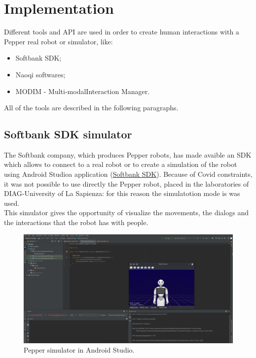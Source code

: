 \documentclass[12pt, letterpaper, twoside]{article}
\begin{document}
\section{Implementation}
Different tools and API are used in order to create human interactions with a Pepper real robot or simulator, like:

\begin{itemize}
	\item Softbank SDK;
	\item Naoqi softwares;
	\item MODIM - Multi-modalInteraction Manager.
\end{itemize}

All of the tools are described in the following paragraphs.\\

\subsection{Softbank SDK simulator}
The Softbank company, which produces Pepper robots, has made avaible an SDK which allows to connect to a real robot or to create a simulation of the robot using Android Studioa application (\href{https://qisdk.softbankrobotics.com/sdk/doc/pepper-sdk/index.html}{Softbank SDK}). Because of Covid constraints, it was not possible to use directly the Pepper robot, placed in the laboratories of DIAG-University of La Sapienza: for this reason the simulatotion mode is was used.\\

This simulator gives the opportunity of visualize the movements, the dialogs and the interactions that the robot has with people.

\begin{figure}[htbp]
	\centerline{\includegraphics[scale=.3]{img/pepperSDK.png}}
	\caption{Pepper simulator in Android Studio.}
	\label{fig:android_sdk}
\end{figure}
\end{document}
